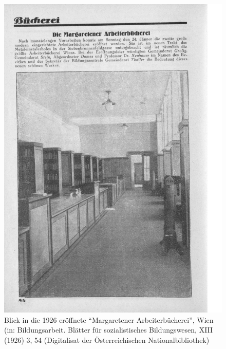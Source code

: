 \documentclass[a4paper,
fontsize=11pt,
oneside,
numbers=noperiodatend,
parskip=half-,
bibliography=totoc,
final
]{scrartcl}
\begin{document}
\begin{figure}
\centering
\includegraphics[width=14 cm]{img/Schuldt01.jpg}
\caption{Blick in die 1926 eröffnete \enquote{Margaretener
Arbeiterbücherei}, Wien (in: Bildungsarbeit. Blätter für sozialistisches
Bildungswesen, XIII (1926) 3, 54 (Digitalisat der Österreichischen
Nationalbibliothek)}
\end{figure}
\end{document}
